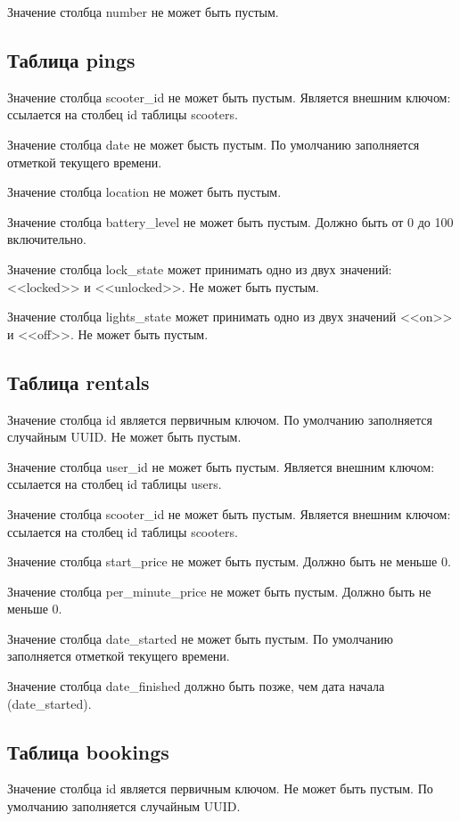 Значение столбца number не может быть пустым.

\subsection{Таблица pings}

Значение столбца scooter\_id не может быть пустым. Является внешним ключом: ссылается на столбец id таблицы scooters.

Значение столбца date не может бысть пустым. По умолчанию заполняется отметкой текущего времени.

Значение столбца location не может быть пустым.

Значение столбца battery\_level не может быть пустым. Должно быть от 0 до 100 включительно.

Значение столбца lock\_state может принимать одно из двух значений: <<locked>> и <<unlocked>>. Не может быть пустым.

Значение столбца lights\_state может принимать одно из двух значений <<on>> и <<off>>. Не может быть пустым.

\subsection{Таблица rentals}

Значение столбца id является первичным ключом. По умолчанию заполняется случайным UUID. Не может быть пустым.

Значение столбца user\_id не может быть пустым. Является внешним ключом: ссылается на столбец id таблицы users.

Значение столбца scooter\_id не может быть пустым. Является внешним ключом: ссылается на столбец id таблицы scooters.

Значение столбца start\_price не может быть пустым. Должно быть не меньше 0.

Значение столбца per\_minute\_price не может быть пустым. Должно быть не меньше 0.

Значение столбца date\_started не может быть пустым. По умолчанию заполняется отметкой текущего времени.

Значение столбца date\_finished должно быть позже, чем дата начала (date\_started).

\subsection{Таблица bookings}

Значение столбца id является первичным ключом. Не может быть пустым. По умолчанию заполняется случайным UUID.

